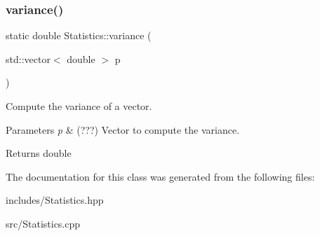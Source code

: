 \subsubsection{\texorpdfstring{variance()}{variance()}}
{\footnotesize\ttfamily static double Statistics\+::variance (\begin{DoxyParamCaption}\item[{std\+::vector$<$ double $>$}]{p }\end{DoxyParamCaption})\hspace{0.3cm}{\ttfamily [static]}}



Compute the variance of a vector. 


\begin{DoxyParams}{Parameters}
{\em p} & (???) Vector to compute the variance. \\
\hline
\end{DoxyParams}
\begin{DoxyReturn}{Returns}
double 
\end{DoxyReturn}


The documentation for this class was generated from the following files\+:\begin{DoxyCompactItemize}
\item 
includes/Statistics.\+hpp\item 
src/Statistics.\+cpp\end{DoxyCompactItemize}
